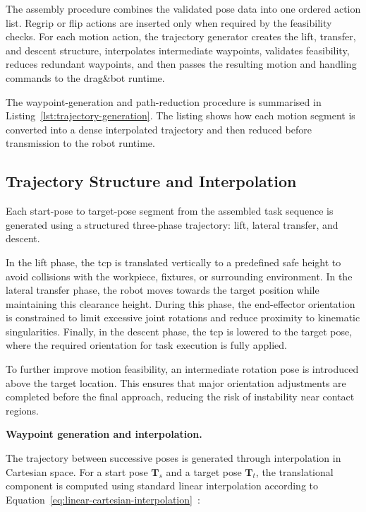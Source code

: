 The assembly procedure combines the validated pose data into one ordered action list. Regrip or flip actions are inserted only when required by the feasibility checks. For each motion action, the trajectory generator creates the lift, transfer, and descent structure, interpolates intermediate waypoints, validates feasibility, reduces redundant waypoints, and then passes the resulting motion and handling commands to the drag\&bot runtime.

The waypoint-generation and path-reduction procedure is summarised in Listing~\ref{lst:trajectory-generation}. The listing shows how each motion segment is converted into a dense interpolated trajectory and then reduced before transmission to the robot runtime.



\subsection{Trajectory Structure and Interpolation}
\label{sec:three-phase-linear-trajectory-structure}

Each start-pose to target-pose segment from the assembled task sequence is generated using a structured three-phase trajectory: lift, lateral transfer, and descent.

In the lift phase, the \ac{tcp} is translated vertically to a predefined safe height to avoid collisions with the workpiece, fixtures, or surrounding environment. In the lateral transfer phase, the robot moves towards the target position while maintaining this clearance height. During this phase, the end-effector orientation is constrained to limit excessive joint rotations and reduce proximity to kinematic singularities. Finally, in the descent phase, the \ac{tcp} is lowered to the target pose, where the required orientation for task execution is fully applied.

To further improve motion feasibility, an intermediate rotation pose is introduced above the target location. This ensures that major orientation adjustments are completed before the final approach, reducing the risk of instability near contact regions.

\label{sec:waypoint-generation-interpolation}
\noindent\textbf{Waypoint generation and interpolation.}

The trajectory between successive poses is generated through interpolation in Cartesian space. For a start pose $\mathbf{T}_s$ and a target pose $\mathbf{T}_t$, the translational component is computed using standard linear interpolation according to Equation~\ref{eq:linear-cartesian-interpolation}~\cite{LibreTextsLinearInterpolation}:

